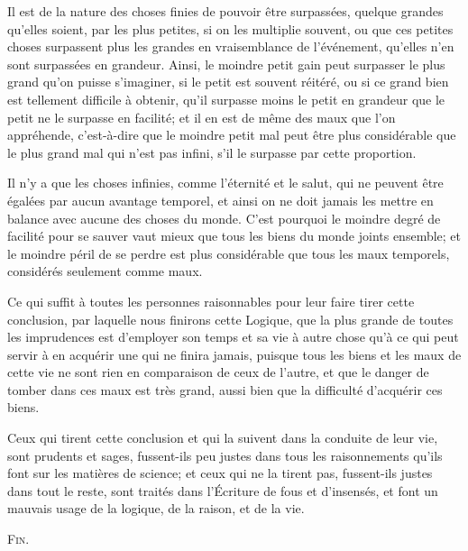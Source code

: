 Il est de la nature des choses finies de pouvoir être surpassées, quelque grandes qu'elles soient, par les plus petites, si on les multiplie souvent, ou que ces petites choses surpassent plus les grandes en vraisemblance de l'événement, qu'elles n'en sont surpassées en grandeur. Ainsi, le moindre petit gain peut surpasser le plus grand qu'on puisse s'imaginer, si le petit est souvent réitéré, ou si ce grand bien est tellement difficile à obtenir, qu'il surpasse moins le petit en grandeur que le petit ne le surpasse en facilité; et il en est de même des maux que l'on appréhende, c'est-à-dire que le moindre petit mal peut être plus considérable que le plus grand mal qui n'est pas infini, s'il le surpasse par cette proportion.

Il n'y a que les choses infinies, comme l'éternité et le salut, qui ne peuvent être égalées par aucun avantage temporel, et ainsi on ne doit jamais les mettre en balance avec aucune des choses du monde. C'est pourquoi le moindre degré de facilité pour se sauver vaut mieux que tous les biens du monde joints ensemble; et le moindre péril de se perdre est plus considérable que tous les maux temporels, considérés seulement comme maux.

Ce qui suffit à toutes les personnes raisonnables pour leur faire tirer cette conclusion, par laquelle nous finirons cette Logique, que la plus grande de toutes les imprudences est d'employer son temps et sa vie à autre chose qu'à ce qui peut servir à en acquérir une qui ne finira jamais, puisque tous les biens et les maux de cette vie ne sont rien en comparaison de ceux de l'autre, et que le danger de tomber dans ces maux est très grand, aussi bien que la difficulté d'acquérir ces biens.

Ceux qui tirent cette conclusion et qui la suivent dans la conduite de leur vie, sont prudents et sages, fussent-ils peu justes dans tous les raisonnements qu'ils font sur les matières de science; et ceux qui ne la tirent pas, fussent-ils justes dans tout le reste, sont traités dans l'Écriture de fous et d'insensés, et font un mauvais usage de la logique, de la raison, et de la vie.

\finpartdeco

\bigbreak
\begin{center}
	{\Large\scshape Fin.}
\end{center}

